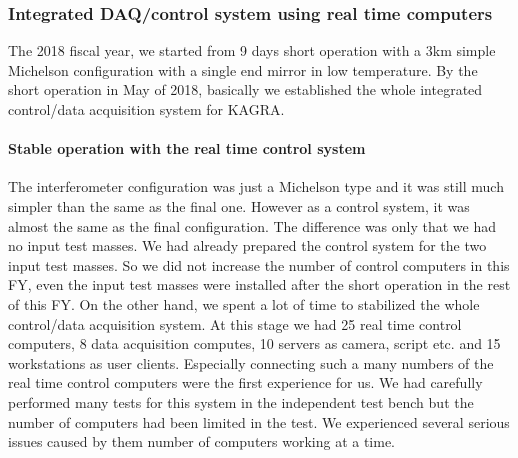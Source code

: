 %
%


\vspace{10pt}
\subsubsection*{\bf  Integrated DAQ/control system using real time computers}
\vspace{3pt}

\vspace{3pt}

\vspace{3pt}


The 2018 fiscal year, we started from 9 days short operation with a 3km simple Michelson configuration with a single end mirror in low temperature. By the short operation in May of 2018, basically we established the whole integrated control/data acquisition system for KAGRA.

\paragraph*{\bi Stable operation with the real time control system}

The interferometer configuration was just a Michelson type and it was still much simpler than the same as the final one. However as a control system, it was almost the same as the final configuration. The difference was only that we had no input test masses. We had already prepared the control system for the two input test masses. So we did not increase the number of control computers in this FY, even the input test masses were installed after the short operation in the rest of this FY. On the other hand, we spent a lot of time to stabilized the whole control/data acquisition system. At this stage we had 25 real time control computers, 8 data acquisition computes, 10 servers as camera, script etc. and 15 workstations as user clients. Especially connecting such a many numbers of the real time control computers were the first experience for us. We had carefully performed many tests for this system in the independent test bench but the number of computers had been limited in the test. We experienced several serious issues caused by them number of computers working at a time.

